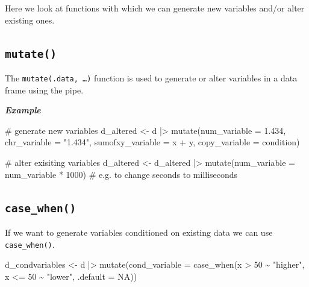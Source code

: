 \documentclass[
  letterpaper,
  DIV=11,
  numbers=noendperiod,
  oneside]{scrreprt}
\newenvironment{Shaded}{\begin{snugshade}}{\end{snugshade}}
\newcommand{\AttributeTok}[1]{\textcolor[rgb]{0.40,0.45,0.13}{#1}}
\newcommand{\CommentTok}[1]{\textcolor[rgb]{0.37,0.37,0.37}{#1}}
\newcommand{\ConstantTok}[1]{\textcolor[rgb]{0.56,0.35,0.01}{#1}}
\newcommand{\DecValTok}[1]{\textcolor[rgb]{0.68,0.00,0.00}{#1}}
\newcommand{\FloatTok}[1]{\textcolor[rgb]{0.68,0.00,0.00}{#1}}
\newcommand{\FunctionTok}[1]{\textcolor[rgb]{0.28,0.35,0.67}{#1}}
\newcommand{\NormalTok}[1]{\textcolor[rgb]{0.00,0.23,0.31}{#1}}
\newcommand{\OtherTok}[1]{\textcolor[rgb]{0.00,0.23,0.31}{#1}}
\newcommand{\SpecialCharTok}[1]{\textcolor[rgb]{0.37,0.37,0.37}{#1}}
\newcommand{\StringTok}[1]{\textcolor[rgb]{0.13,0.47,0.30}{#1}}
\begin{document}
Here we look at functions with which we can generate new variables
and/or alter existing ones.

\hypertarget{mutate}{%
\subsection{\texorpdfstring{\texttt{mutate()}}{mutate()}}\label{mutate}}

The \texttt{mutate(.data,\ …)} function is used to generate or alter
variables in a data frame using the pipe.

\textbf{\emph{Example}}

\begin{Shaded}
\begin{Highlighting}[]
\CommentTok{\# generate new variables}
\NormalTok{d\_altered }\OtherTok{\textless{}{-}}\NormalTok{ d }\SpecialCharTok{|\textgreater{}}
    \FunctionTok{mutate}\NormalTok{(}\AttributeTok{num\_variable =} \FloatTok{1.434}\NormalTok{,}
           \AttributeTok{chr\_variable =} \StringTok{"1.434"}\NormalTok{,}
           \AttributeTok{sumofxy\_variable =}\NormalTok{ x }\SpecialCharTok{+}\NormalTok{ y,}
           \AttributeTok{copy\_variable =}\NormalTok{ condition)}

\CommentTok{\# alter exisiting variables}
\NormalTok{d\_altered }\OtherTok{\textless{}{-}}\NormalTok{ d\_altered }\SpecialCharTok{|\textgreater{}}
    \FunctionTok{mutate}\NormalTok{(}\AttributeTok{num\_variable =}\NormalTok{ num\_variable }\SpecialCharTok{*} \DecValTok{1000}\NormalTok{) }\CommentTok{\# e.g. to change seconds to milliseconds}
\end{Highlighting}
\end{Shaded}

\hypertarget{case_when}{%
\subsection{\texorpdfstring{\texttt{case\_when()}}{case\_when()}}\label{case_when}}

If we want to generate variables conditioned on existing data we can use
\texttt{case\_when()}.

\begin{Shaded}
\begin{Highlighting}[]
\NormalTok{d\_condvariables }\OtherTok{\textless{}{-}}\NormalTok{ d }\SpecialCharTok{|\textgreater{}}
    \FunctionTok{mutate}\NormalTok{(}\AttributeTok{cond\_variable =} \FunctionTok{case\_when}\NormalTok{(x }\SpecialCharTok{\textgreater{}} \DecValTok{50} \SpecialCharTok{\textasciitilde{}} \StringTok{"higher"}\NormalTok{,}
\NormalTok{                                     x }\SpecialCharTok{\textless{}=} \DecValTok{50} \SpecialCharTok{\textasciitilde{}} \StringTok{"lower"}\NormalTok{,}
                                     \AttributeTok{.default =} \ConstantTok{NA}\NormalTok{))}
\end{Highlighting}
\end{Shaded}
\end{document}
